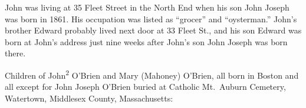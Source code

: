 John was living at 35 Fleet Street in the North End when his son John Joseph was born in 1861. His occupation was listed as ``grocer''\cite{John3OBrienBirth:1,Wards:1} and ``oysterman.''\cite{1861John2OBrien:1} John's brother Edward probably lived next door at 33 Fleet St.,\cite{1861EdwardOBrien} and his son Edward was born at John's address just nine weeks after John's son John Joseph was born there.\cite{John3OBrienBirth:3}

\begin{KidsIntro}
	Children of John\textsuperscript{2} O'Brien and Mary (Mahoney) O'Brien, all born in Boston and all except for John Joseph O'Brien buried at Catholic Mt.\ Auburn Cemetery, Watertown, Middlesex County, Massachusetts:\cite{BillMcEvoy:3}
\end{KidsIntro}

